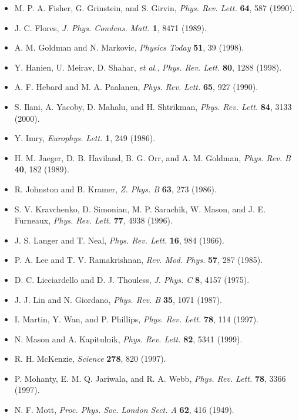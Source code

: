 \begin{itemize}[leftmargin=2em,itemsep=0pt,parsep=0pt,label={}]
\item [F1990] M. P. A. Fisher, G. Grinstein, and S. Girvin, \emph{Phys. Rev. Lett.} \textbf{64}, 587 (1990).
\item [F1989] J. C. Flores, \emph{J. Phys. Condens. Matt.} \textbf{1}, 8471 (1989).
\item [GM1998] A. M. Goldman and N. Markovic, \emph{Physics Today} \textbf{51}, 39 (1998).
\item [H1998] Y. Hanien, U. Meirav, D. Shahar, \emph{et al.}, \emph{Phys. Rev. Lett.} \textbf{80}, 1288 (1998).
\item [HP1990] A. F. Hebard and M. A. Paalanen, \emph{Phys. Rev. Lett.} \textbf{65}, 927 (1990).
\item [I2000] S. Ilani, A. Yacoby, D. Mahalu, and H. Shtrikman, \emph{Phys. Rev. Lett.} \textbf{84}, 3133 (2000).
\item [I1986] Y. Imry, \emph{Europhys. Lett.} \textbf{1}, 249 (1986).
\item [J1989] H. M. Jaeger, D. B. Haviland, B. G. Orr, and A. M. Goldman, \emph{Phys. Rev. B} \textbf{40}, 182 (1989).
\item [JK1986] R. Johnston and B. Kramer, \emph{Z. Phys. B} \textbf{63}, 273 (1986).
\item [K1996] S. V. Kravchenko, D. Simonian, M. P. Sarachik, W. Mason, and J. E. Furneaux, \emph{Phys. Rev. Lett.} \textbf{77}, 4938 (1996).
\item [LN1966] J. S. Langer and T. Neal, \emph{Phys. Rev. Lett.} \textbf{16}, 984 (1966).
\item [LR1985] P. A. Lee and T. V. Ramakrishnan, \emph{Rev. Mod. Phys.} \textbf{57}, 287 (1985).
\item [LT1975] D. C. Licciardello and D. J. Thouless, \emph{J. Phys. C} \textbf{8}, 4157 (1975).
\item [LG1987] J. J. Lin and N. Giordano, \emph{Phys. Rev. B} \textbf{35}, 1071 (1987).
\item [MWP1997] I. Martin, Y. Wan, and P. Phillips, \emph{Phys. Rev. Lett.} \textbf{78}, 114 (1997).
\item [MK1999] N. Mason and A. Kapitulnik, \emph{Phys. Rev. Lett.} \textbf{82}, 5341 (1999).
\item [M1997] R. H. McKenzie, \emph{Science} \textbf{278}, 820 (1997).
\item [MJW1997] P. Mohanty, E. M. Q. Jariwala, and R. A. Webb, \emph{Phys. Rev. Lett.} \textbf{78}, 3366 (1997).
\item [M1949] N. F. Mott, \emph{Proc. Phys. Soc. London Sect. A} \textbf{62}, 416 (1949).

\end{itemize}
